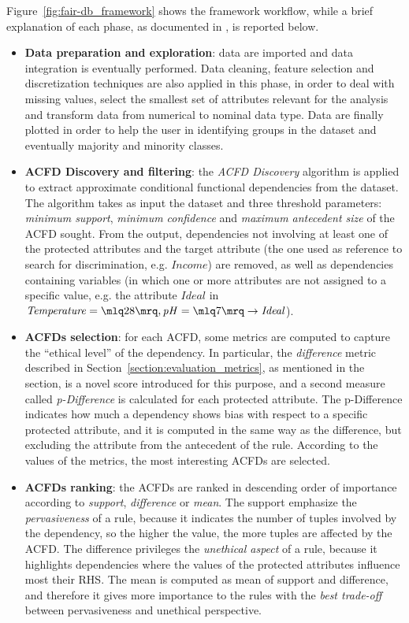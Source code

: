 Figure~\ref{fig:fair-db_framework} shows the framework workflow, while a brief explanation of each phase, as documented in \cite{azzalini2021fair}, is reported below.
\begin{itemize}
\item \textbf{Data preparation and exploration}: data are imported and data integration is eventually performed. Data cleaning, feature selection and discretization techniques are also applied in this phase, in order to deal with missing values, select the smallest set of attributes relevant for the analysis and transform data from numerical to nominal data type. Data are finally plotted in order to help the user in identifying groups in the dataset and eventually majority and minority classes.
\item \textbf{ACFD Discovery and filtering}: the \textit{ACFD Discovery} algorithm is applied to extract approximate conditional functional dependencies from the dataset. The algorithm takes as input the dataset and three threshold parameters: \textit{minimum support}, \textit{minimum confidence} and \textit{maximum antecedent size} of the ACFD sought. From the output, dependencies not involving at least one of the protected attributes and the target attribute (the one used as reference to search for discrimination, e.g. \(\mathit{Income}\)) are removed, as well as dependencies containing variables (in which one or more attributes are not assigned to a specific value, e.g. the attribute \(\mathit{Ideal}\) in \(\mathit{Temperature} = \mlq 28 \mrq, \mathit{pH} = \mlq 7 \mrq \rightarrow \mathit{Ideal}\)).
\item \textbf{ACFDs selection}: for each ACFD, some metrics are computed to capture the ``ethical level'' of the dependency. In particular, the \textit{difference} metric described in Section~\ref{section:evaluation_metrics}, as mentioned in the section, is a novel score introduced for this purpose, and a second measure called \textit{p-Difference} is calculated for each protected attribute. The p-Difference indicates how much a dependency shows bias with respect to a specific protected attribute, and it is computed in the same way as the difference, but excluding the attribute from the antecedent of the rule. According to the values of the metrics, the most interesting ACFDs are selected.
\item \textbf{ACFDs ranking}: the ACFDs are ranked in descending order of importance according to \textit{support}, \textit{difference} or \textit{mean}. The support emphasize the \textit{pervasiveness} of a rule, because it indicates the number of tuples involved by the dependency, so the higher the value, the more tuples are affected by the ACFD. The difference privileges the \textit{unethical aspect} of a rule, because it highlights dependencies where the values of the protected attributes influence most their RHS. The mean is computed as mean of support and difference, and therefore it gives more importance to the rules with the \textit{best trade-off} between pervasiveness and unethical perspective.

\end{itemize}
